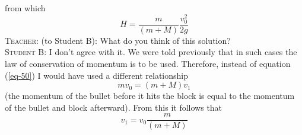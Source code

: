 \documentclass[a4paper,sfsidenotes]{tufte-book}
\begin{document}
from which \\
\begin{equation}
H = \frac{m}{(m + M)} 	\frac{v_{0}^{2}}{2g}
\label{eq-53}
\end{equation}
\textsc{Teacher:} (to Student B): What do you think of this solution?
\\
\textsc{Student B:} I don't agree with it. We were told previously that in such cases the law of conservation of momentum is to be used. Therefore, instead of equation (\ref{eq-50}) I would have used
a different relationship 
\\
\begin{equation}
mv_{0} = (m+M) v_{1}
\label{eq-54}
\end{equation}
(the momentum of the bullet before it hits the block is equal to the momentum of the bullet and block afterward). From this it follows that
\\
\begin{equation}
v_{1} = v_{0} \frac{m}{(m + M)}
\label{eq-55}
\end{equation}
\end{document}
